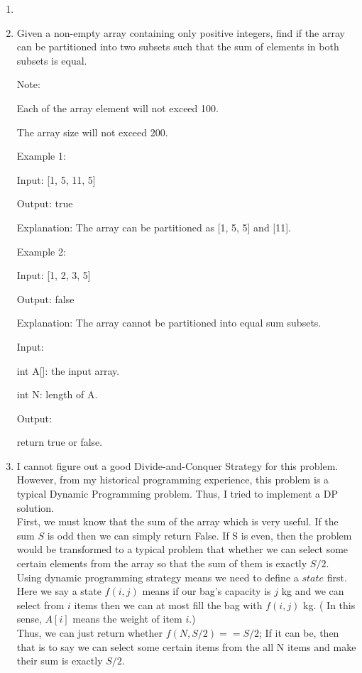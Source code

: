 \documentclass[12pt,a4paper]{article}
\makeatletter
\newtheorem*{solution}{Solution}
\renewenvironment{solution}[1][Solution] {\par\pushQED{\qed}\normalfont\topsep6\p@\@plus6\p@\relax\trivlist\item[\hskip\labelsep\bfseries#1\@addpunct{.}]\ignorespaces}{\popQED\endtrivlist\@endpefalse} \makeatother
\makeatother
\begin{document}
\begin{enumerate}
\begin{solution}
\end{solution}

\item Given a non-empty array containing only positive integers, find if the array can be partitioned into two subsets such that the sum of elements in both subsets is equal.

Note:

Each of the array element will not exceed 100.

The array size will not exceed 200.

Example 1:

Input: [1, 5, 11, 5]

Output: true

Explanation: The array can be partitioned as [1, 5, 5] and [11].

Example 2:

Input: [1, 2, 3, 5]

Output: false

Explanation: The array cannot be partitioned into equal sum subsets.

Input:

int A[]: the input array.

int N: length of A.

Output:

return true or false.

\begin{solution}
I cannot figure out a good Divide-and-Conquer Strategy for this problem. However, from my historical programming experience, this problem is a typical Dynamic Programming problem. Thus, I tried to implement a DP solution.\\
First, we must know that the sum of the array which is very useful. If the sum $S$ is odd then we can simply return False. If S is even, then the problem would be transformed to a typical problem that whether we can select some certain elements from the array so that the sum of them is exactly $S/2$.\\
Using dynamic programming strategy means we need to define a $state$ first.
Here we say a state $f(i,j)$ means if our bag's capacity is $j$ kg and we can select from $i$ items then we can at most fill the bag with $f(i,j)$ kg. ( In this sense, $A[i]$ means the weight of item $i$.)\\
Thus, we can just return whether $f(N,S/2) == S/2$; If it can be, then that is to say we can select some certain items from the all N items and make their sum is exactly $S/2$.


\end{solution}
\end{enumerate}
\end{document}
